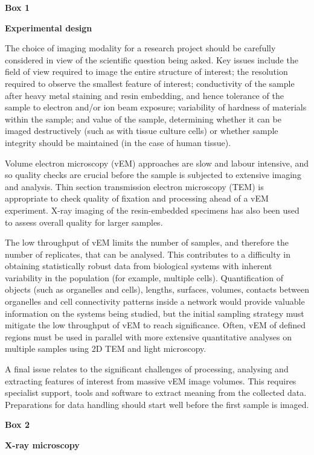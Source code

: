 \documentclass{article}
\begin{document}
\noindent\textbf{Box 1}
\begin{center}\textbf{Experimental design}\end{center}

The choice of imaging modality for a research project should be carefully considered in view of the scientific question being asked. Key issues include the field of view required to image the entire structure of interest; the resolution required to observe the smallest feature of interest; conductivity of the sample after heavy metal staining and resin embedding, and hence tolerance of the sample to electron and/or ion beam exposure; variability of hardness of materials within the sample; and value of the sample, determining whether it can be imaged destructively (such as with tissue culture cells) or whether sample integrity should be maintained (in the case of human tissue).

Volume electron microscopy (vEM) approaches are slow and labour intensive, and so quality checks are crucial before the sample is subjected to extensive imaging and analysis. Thin section transmission electron microscopy (TEM) is appropriate to check quality of fixation and processing ahead of a vEM experiment. X-ray imaging of the resin-embedded specimens has also been used to assess overall quality for larger samples.

The low throughput of vEM limits the number of samples, and therefore the number of replicates, that can be analysed. This contributes to a difficulty in obtaining statistically robust data from biological systems with inherent variability in the population (for example, multiple cells). Quantification of objects (such as organelles and cells), lengths, surfaces, volumes, contacts between organelles and cell connectivity patterns inside a network would provide valuable information on the systems being studied, but the initial sampling strategy must mitigate the low throughput of vEM to reach significance. Often, vEM of defined regions must be used in parallel with more extensive quantitative analyses on multiple samples using 2D TEM and light microscopy.

A final issue relates to the significant challenges of processing, analysing and extracting features of interest from massive vEM image volumes. This requires specialist support, tools and software to extract meaning from the collected data. Preparations for data handling should start well before the first sample is imaged.

\noindent\textbf{Box 2}
\begin{center}\textbf{X-ray microscopy}\end{center}
\end{document}
